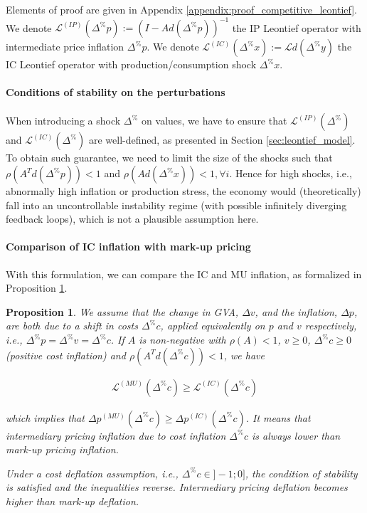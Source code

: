 \documentclass{article}
\newtheorem{proposition}{Proposition}
\begin{document}
\noindent Elements of proof are given in Appendix \ref{appendix:proof_competitive_leontief}. We denote $\mathcal{L}^{(IP)}(\Delta^\% p) := \left( I - A d(\Delta^\% p) \right)^{-1}$ the IP Leontief operator with intermediate price inflation $\Delta^\% p$. We denote $\mathcal{L}^{(IC)}(\Delta^\% x):=\mathcal{L} d(\Delta^\% y)$ the IC Leontief operator with production/consumption shock $\Delta^\% x$. 

\paragraph{Conditions of stability on the perturbations} When introducing a shock $\Delta^{\%}$ on values, we have to ensure that $\mathcal{L}^{(IP)}(\Delta^\%)$ and $\mathcal{L}^{(IC)}(\Delta^\%)$ are well-defined, as presented in Section \ref{sec:leontief_model}. To obtain such guarantee, we need to limit the size of the shocks such that $\rho( A^T d(\Delta^\% p))<1$ and $\rho(A d(\Delta^\% x))<1, \forall i$. Hence for high shocks, i.e., abnormally high inflation or production stress, the economy would (theoretically) fall into an uncontrollable instability regime (with possible infinitely diverging feedback loops), which is not a plausible assumption here. 

\paragraph{Comparison of IC inflation with mark-up pricing}
With this formulation, we can compare the IC and MU inflation, as formalized in Proposition \ref{proposition:comparison_intermediary_markup}. 

\begin{proposition}
\label{proposition:comparison_intermediary_markup}
We assume that the change in GVA, $\Delta v$, and the inflation, $\Delta p$, are both due to a shift in costs $\Delta^{\%} c$, applied equivalently on $p$ and $v$ respectively, i.e., $\Delta^{\%} p = \Delta^{\%} v = \Delta^{\%} c$. 
If $A$ is non-negative with $\rho(A)<1$, $v \geq 0$, $\Delta^{\%} c \geq 0$ (positive cost inflation) and $\rho(A^T d(\Delta^\%c)) < 1$, we have

    \begin{align}
        \mathcal{L}^{(MU)}(\Delta^\% c) \geq \mathcal{L}^{(IC)}(\Delta^\% c)
    \end{align}

    \noindent which implies that $\Delta p^{(MU)}(\Delta^\% c) \geq \Delta p^{(IC)}(\Delta^\% c)$. It means that intermediary pricing inflation due to cost inflation $\Delta^\% c$ is always lower than mark-up pricing inflation.

    Under a cost deflation assumption, i.e., $\Delta^{\%} c \in ]-1;0]$, the condition of stability is satisfied and the inequalities reverse. Intermediary pricing deflation becomes higher than mark-up deflation. 
\end{proposition}
\end{document}
